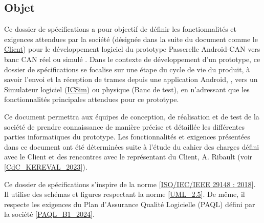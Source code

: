 \subsection{Objet} %
Ce dossier de spécifications a pour objectif de définir les fonctionnalités et exigences attendues par la société {\client} (désignée dans la suite du document comme le \hyperref[client_kereval]{Client}) pour le développement logiciel du prototype {\guillemotleft} Passerelle Android-CAN vers banc CAN réel ou simulé {\guillemotright}. 
Dans le contexte de développement d'un prototype, ce dossier de spécifications se focalise sur une étape du cycle de vie du produit, à savoir l'envoi et la réception de trames depuis une application Android, {\nomApplication}, vers un Simulateur logiciel (\hyperref[ICSim]{ICSim}) ou physique (Banc de test), en n'adressant que les fonctionnalités principales attendues pour ce prototype.
\medskip 

Ce document permettra aux équipes de conception, de réalisation et de test de la société {\client} de prendre connaissance de manière précise et détaillée les différentes parties informatiques du prototype.
Les fonctionnalités et exigences présentées dans ce document ont été déterminées suite à l'étude du cahier des charges défini avec le Client et des rencontres avec le représentant du Client, A. Ribault (voir [\hyperref[cdc_kereval]{CdC\_KEREVAL\_2023}]). 
\medskip 

Ce dossier de spécifications s'inspire de la norme [\hyperref[norme]{ISO/IEC/IEEE 29148 : 2018}]. Il utilise des schémas et figures respectant la norme [\hyperref[uml_version]{UML\_2.5}]. 
De même, il respecte les exigences du Plan d'Assurance Qualité Logicielle (PAQL) défini par la société {\teamName} [\hyperref[paql]{PAQL\_B1\_2024}].
\medskip
